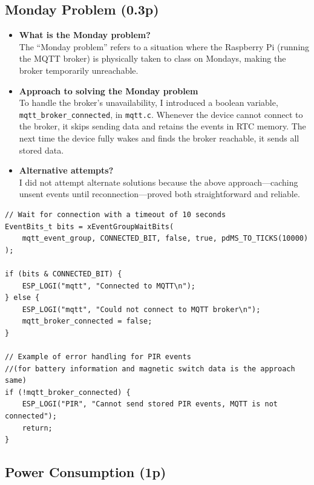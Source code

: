 \documentclass[A4,10pt]{article}
\begin{document}
\subsection{Monday Problem (0.3p)}

\begin{itemize}[noitemsep]
    \item \textbf{What is the Monday problem?}\\
    The “Monday problem” refers to a situation where the Raspberry Pi (running the MQTT broker) is physically taken to class on Mondays, making the broker temporarily unreachable.

    \item \textbf{Approach to solving the Monday problem}\\
    To handle the broker’s unavailability, I introduced a boolean variable, \texttt{mqtt\_broker\_connected}, in \texttt{mqtt.c}. Whenever the device cannot connect to the broker, it skips sending data and retains the events in RTC memory. The next time the device fully wakes and finds the broker reachable, it sends all stored data.

    \item \textbf{Alternative attempts?}\\
    I did not attempt alternate solutions because the above approach—caching unsent events until reconnection—proved both straightforward and reliable.
\end{itemize}

\begin{verbatim}
// Wait for connection with a timeout of 10 seconds
EventBits_t bits = xEventGroupWaitBits(
    mqtt_event_group, CONNECTED_BIT, false, true, pdMS_TO_TICKS(10000)
);

if (bits & CONNECTED_BIT) {
    ESP_LOGI("mqtt", "Connected to MQTT\n");
} else {
    ESP_LOGI("mqtt", "Could not connect to MQTT broker\n");
    mqtt_broker_connected = false;
}

// Example of error handling for PIR events 
//(for battery information and magnetic switch data is the approach same)
if (!mqtt_broker_connected) {
    ESP_LOGI("PIR", "Cannot send stored PIR events, MQTT is not connected");
    return;
}
\end{verbatim}

 
\subsection{Power Consumption (1p)}
\end{document}
